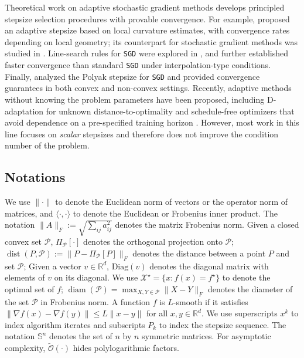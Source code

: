\documentclass{article}
\theoremstyle{definition}
\newcommand{\assign}{:=}
\newcommand{\tmop}[1]{\ensuremath{\operatorname{#1}}}
\newcommand{\sgd}{\texttt{SGD}}
\begin{document}
Theoretical work on adaptive stochastic gradient methods develops principled stepsize selection procedures with provable convergence. 
For example, \cite{Malitsky20} proposed an adaptive stepsize based on local curvature estimates, with convergence rates depending on local geometry; 
its counterpart for stochastic gradient methods was studied in \cite{aujol2025stochastic}. 
Line-search rules for {\sgd} were explored in \cite{vaswani2019painless,vaswani2025armijo}, and \cite{vaswani2025armijo} further established faster convergence than standard {\sgd} under interpolation-type conditions. Finally, \cite{loizou2021stochastic} analyzed the Polyak stepsize for {\sgd} and provided convergence guarantees in both convex and non-convex settings. 
Recently, adaptive methods without knowing the problem parameters have been proposed, including D-adaptation for unknown distance-to-optimality \cite{defazio2023learning} and schedule-free optimizers that avoid dependence on a pre-specified training horizon \cite{defazio2024road}.  
However, most work in this line focuses on \emph{scalar} stepsizes and therefore does not improve the condition number of the problem.


\subsection{Notations}

We use $\| \cdot \|$ to denote the Euclidean norm of vectors or the operator norm of matrices, and $\langle \cdot, \cdot
\rangle$ to denote the Euclidean or Frobenius inner product. The notation
$\| A \|_F \assign \sqrt{\sum_{i j} a_{i j}^2}$ denotes the matrix Frobenius norm. Given a closed convex set $\mathcal{P}$, $\Pi_{\mathcal{P}} [\cdot]$ denotes the orthogonal projection onto $\mathcal{P}$; $\tmop{dist} (P, \mathcal{P}) \assign \| P - \Pi_{\mathcal{P}}
[P] \|_F$ denotes the distance between a point $P$ and set 
$\mathcal{P}$; Given a vector $v\in \mathbb{R}^d$, $\text{Diag}(v)$ denotes the diagonal matrix with elements of $v$ on its diagonal.
We use $\mathcal{X}^{\star} = \{ x : f (x) = f^{\star} \}$ to denote the optimal
set of $f$; $\tmop{diam} (\mathcal{P}) = \max_{X, Y \in \mathcal{P}}  \| X
- Y \|_F$ denotes the diameter of the set $\mathcal{P}$ in Frobenius norm. 
A function $f$ is $L$-smooth if it satisfies $\| \nabla f(x) - \nabla f(y) \| \leq L \|x - y\|$ for all $x, y \in \mathbb{R}^d$. 
We use superscripts $x^k$ to index algorithm iterates and subscripts $P_k$ to index the stepsize sequence. The notation $\mathbb{S}^{n}$ denotes the set of $n$ by $n$ symmetric matrices. 
For asymptotic complexity, $\tilde{\mathcal{O}}(\cdot)$ hides polylogarithmic factors.
\end{document}
